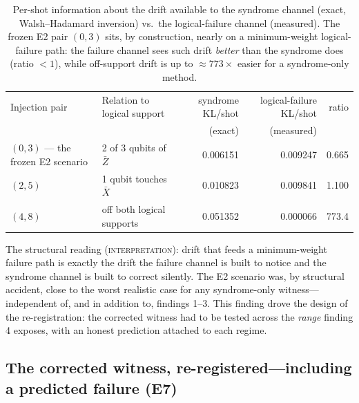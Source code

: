 \documentclass[11pt]{article}
\newcommand{\grade}[1]{\textsc{#1}}
\newcommand{\gInterp}{\grade{interpretation}}
\theoremstyle{definition}
\begin{document}
\begin{table}[htbp]
\centering\small
\begin{tabular}{l l r r r}
\toprule
Injection pair & Relation to logical support & syndrome KL/shot & logical-failure KL/shot & ratio \\
 & & (exact) & (measured) & \\
\midrule
$(0,3)$ --- the frozen E2 scenario & 2 of 3 qubits of $\bar{Z}$ & 0.006151 & 0.009247 & 0.665 \\ $(2,5)$ & 1 qubit touches $\bar{X}$ & 0.010823 & 0.009841 & 1.100 \\ $(4,8)$ & off both logical supports & 0.051352 & 0.000066 & 773.4 \\ \bottomrule
\end{tabular}
\caption{Per-shot information about the drift available to the syndrome channel (exact, Walsh--Hadamard inversion) vs.\ the logical-failure channel (measured). The frozen E2 pair $(0,3)$ sits, by construction, nearly on a minimum-weight logical-failure path: the failure channel sees such drift \emph{better} than the syndrome does (ratio $< 1$), while off-support drift is up to $\approx 773\times$ easier for a syndrome-only method.} \label{tab:kl}
\end{table}

The structural reading (\gInterp): drift that feeds a minimum-weight failure path is exactly the drift the failure channel is built to notice and the syndrome channel is built to correct silently. The E2 scenario was, by structural accident, close to the worst realistic case for any syndrome-only witness---independent of, and in addition to, findings 1--3. This finding drove the design of the re-registration: the corrected witness had to be tested across the \emph{range} finding 4 exposes, with an honest prediction attached to each regime.

\subsection{The corrected witness, re-registered---including a predicted failure (E7)}
\label{sec:e7}
\end{document}
